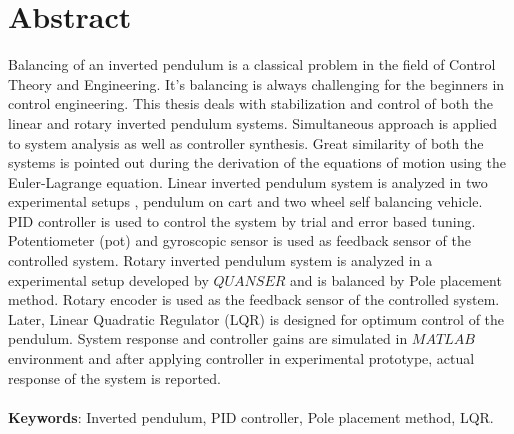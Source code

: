 
\chapter*{Abstract}
Balancing of an inverted pendulum is a classical problem in the field of Control Theory and Engineering. It's balancing is always challenging for the beginners in control engineering. This thesis deals with stabilization and control of both the linear and rotary inverted pendulum  systems. Simultaneous approach is applied to system analysis as well as controller synthesis. Great similarity of both the systems is pointed out during the derivation of the equations of motion using the Euler-Lagrange equation. Linear inverted pendulum system is analyzed in two experimental setups , pendulum on cart and two wheel self balancing vehicle. PID controller is used to control the system by trial and error based tuning. Potentiometer (pot) and gyroscopic sensor is used as feedback sensor of the controlled system. Rotary inverted pendulum system is analyzed in a experimental setup developed by $QUANSER$ and is balanced by Pole placement method. Rotary encoder is used as the feedback sensor of the controlled system. Later, Linear Quadratic Regulator (LQR) is designed for optimum control of the pendulum. System response and controller gains are simulated in $MATLAB$ environment and after applying controller in experimental prototype, actual response of the system is reported. \\ 
\\ \textbf{Keywords}: Inverted pendulum,  PID controller, Pole placement method, LQR.
\clearpage
